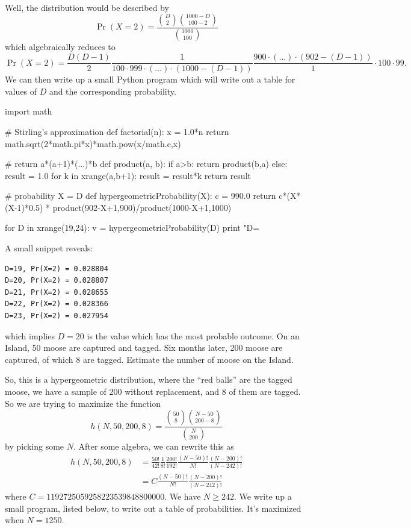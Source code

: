 Well, the distribution would be described by
\begin{equation}
\Pr(X=2)=\frac{\binom{D}{2}\binom{1000-D}{100-2}}{\binom{1000}{100}}
\end{equation}
which algebraically reduces to
\begin{equation}
\Pr(X=2)=\frac{D(D-1)}{2}\frac{1}{100\cdot999\cdot(\dots)\cdot(1000-(D-1))}
\frac{900\cdot(\dots)\cdot(902-(D-1))}{1}\cdot100\cdot99.
\end{equation}
We can then write up a small Python program which will write out a table for
values of $D$ and the corresponding probability.
\begin{python}
import math

# Stirling's approximation
def factorial(n):
    x = 1.0*n
    return math.sqrt(2*math.pi*x)*math.pow(x/math.e,x)

# return a*(a+1)*(...)*b
def product(a, b):
    if a>b:
        return product(b,a)
    else:
        result = 1.0
        for k in xrange(a,b+1):
            result = result*k
        return result

# probability X = D
def hypergeometricProbability(X):
    c = 990.0
    return c*(X*(X-1)*0.5) * product(902-X+1,900)/product(1000-X+1,1000)

for D in xrange(19,24):
    v = hypergeometricProbability(D)
    print "D=%
\end{python}
A small snippet reveals:
\begin{Verbatim}[fontsize=\footnotesize]
D=19, Pr(X=2) = 0.028804
D=20, Pr(X=2) = 0.028807
D=21, Pr(X=2) = 0.028655
D=22, Pr(X=2) = 0.028366
D=23, Pr(X=2) = 0.027954
\end{Verbatim}
which implies $D=20$ is the value which has the most probable
outcome. 
On an Island, 50 moose are captured and tagged. Six months later, 200
moose are captured, of which 8 are tagged. Estimate the number of moose
on the Island.

So, this is a hypergeometric distribution, where the ``red balls'' are
the tagged moose, we have a sample of 200 without replacement, and 8 of
them are tagged. So we are trying to maximize the function
\begin{equation}
h(N,50,200,8)=\frac{\binom{50}{8}\binom{N-50}{200-8}}{\binom{N}{200}}
\end{equation}
by picking some $N$. After some algebra, we can rewrite this as
\begin{equation}
\begin{split}
h(N,50,200,8)&=\frac{50!}{42!}\frac{1}{8!}\frac{200!}{192!}\frac{(N-50)!}{N!}\frac{(N-200)!}{(N-242)!}\\
&=C\frac{(N-50)!}{N!}\frac{(N-200)!}{(N-242)!}
\end{split}
\end{equation}
where $C=1192725059258223539848800000$. 
We have $N\geq242$. We write up a small program, listed below, to write
out a table of probabilities. It's maximized when $N=1250$.


